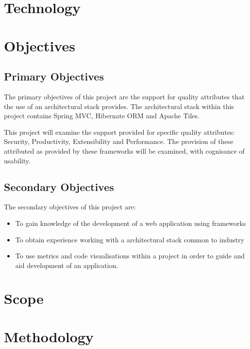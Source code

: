 \section{Technology}

\section{Objectives}

\subsection{Primary Objectives}

The primary objectives of this project are the support for quality attributes that the use of an architectural stack provides. The architectural stack within this project contains Spring MVC, Hibernate ORM and Apache Tiles. 

This project will examine the support provided for specific quality attributes: Security, Productivity, Extensibility and Performance. The provision of these attributed as provided by these frameworks will be examined, with cognisance of usability. 

\subsection{Secondary Objectives}

The secondary objectives of this project are: 

\begin{itemize}
\item To gain knowledge of the development of a web application using frameworks
\item To obtain experience working with a architectural stack common to industry
\item To use metrics and code visualisations within a project in order to guide and aid development of an application.
\end{itemize}

\section{Scope}

\section{Methodology}

\
